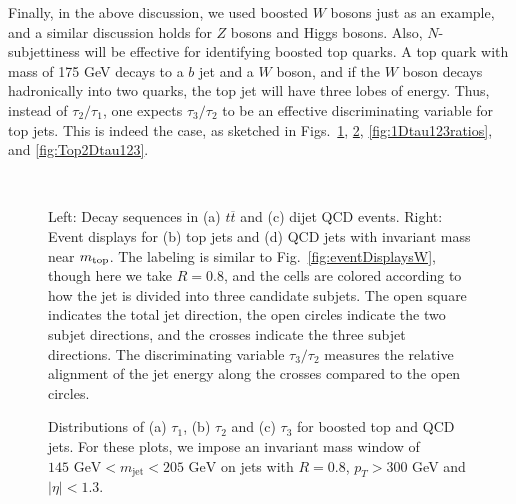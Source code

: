 \documentclass{JHEP3}
\newcommand{\vsh}{\vspace{-.5cm}}
\DeclareRobustCommand{\Fig}[1]{Fig.~\ref{#1}}
\begin{document}
Finally, in the above discussion, we used boosted $W$ bosons just as an example, and a similar discussion holds for $Z$ bosons and Higgs bosons.  Also, $N$-subjettiness will be effective for identifying boosted top quarks.   A top quark with mass of 175 GeV decays to a $b$ jet and a $W$ boson, and if the $W$ boson decays hadronically into two quarks, the top jet will have three lobes of energy.  Thus, instead of $\tau_2/\tau_1$, one expects $\tau_3/\tau_2$ to be an effective discriminating variable for top jets.  This is indeed the case, as sketched in Figs.~\ref{fig:eventDisplaysTop}, \ref{fig:1Dtau1tau2tau3}, \ref{fig:1Dtau123ratios}, and \ref{fig:Top2Dtau123}.

\begin{figure}[tp]
  \begin{center}
    \\
  \end{center}
  \caption{Left:  Decay sequences in (a) $t\overline{t}$ and (c) dijet QCD events.  Right:  Event displays for (b) top jets and (d) QCD jets with invariant mass near $m_{\rm top}$.  The labeling is similar to \Fig{fig:eventDisplaysW}, though here we take $R=0.8$, and the cells are colored according to how the jet is divided into three candidate subjets.  The open square indicates the total jet direction, the open circles indicate the two subjet directions, and the crosses indicate the three subjet directions.  The discriminating variable $\tau_3/\tau_2$ measures the relative alignment of the jet energy along the crosses compared to the open circles.}
  \label{fig:eventDisplaysTop}
\end{figure}

\clearpage


\begin{figure}[p]
  \begin{center}
  \end{center}
  \vsh
    \caption{Distributions of (a) $\tau_1$, (b) $\tau_2$ and (c) $\tau_3$ for boosted top and QCD jets.  For these plots, we impose an invariant mass window of $145 \text{ GeV} < m_{\text{jet}} < 205 \text{ GeV} $ on jets with $R = 0.8$, $p_T > 300$ GeV and $|\eta| < 1.3$.}
    \label{fig:1Dtau1tau2tau3}
\end{figure}
\end{document}
